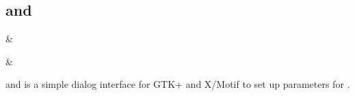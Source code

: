 \subsection{\XfilemonName{} and \XmfilemonName}

\begin{expara}

\XfilemonName{} \&

\XmfilemonName{} \&

\end{expara}

\PrXfilemon{} and \PrXmfilemon{} is a simple dialog interface for GTK+ and X/Motif to set up
parameters for \PrBtfilemon{}.

